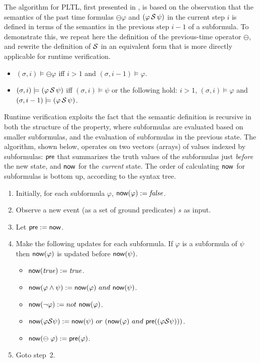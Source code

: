The algorithm for PLTL, first presented in \cite{HR}, 
is based on the observation that the semantics of the 
past time formulas $\ominus \varphi$ and $(\varphi\, {\cal S} \,\psi)$ in the current step $i$ is defined in terms of the semantics
in the previous step $i - 1$ of a subformula.
To demonstrate this, we repeat here the definition of the previous-time
operator $\ominus$, and rewrite the definition
of ${\cal S}$ in an equivalent form that is
more directly applicable for runtime verification.
\begin{itemize}
\item $( \sigma , i) \models \ominus \varphi$ iff $i > 1$ and $(\sigma, i-1) \models \varphi$.
\item $(\sigma , i) \models (\varphi \, {\cal S} \, \psi)$ iff $(\sigma , i) \models \psi$ or the following hold: $i>1$,
$( \sigma , i)  \models \varphi$ and 
$(\sigma , i-1 ) \models ( \varphi \, {\cal S} \, \psi )$.
\end{itemize}
Runtime verification exploits the fact that
the semantic definition is recursive in both the structure of the property, where subformulas
are evaluated based on smaller subformulas, and the
evaluation of subformulas in the previous state.
The algorithm, shown below, operates on two vectors (arrays) of values indexed by subformulas:  $\mathsf{pre}$ that summarizes the truth values of the
subformulas just {\em before} the new state, and $\mathsf{now}$ for the {\em current} state. The order of calculating $\mathsf{now}$ for subformulas is bottom up, according to the syntax tree.
\begin{enumerate}
\item Initially, for each subformula $\varphi$,
$\mathsf{now} ( \varphi ) := \mathit{false}$.
\item Observe a new event (as a set of ground predicates) $s$ as input. 
\item Let $\mathsf{pre} := \mathsf{now}$.
\item Make the following updates for each subformula. If $\varphi$ is
      a subformula of $\psi$ then $\mathsf{now} ( \varphi )$ is updated before 
      $\mathsf{now} ( \psi )$.

\begin{itemize}
  \item $\mathsf{now} ( \mathit{true} ) := \mathit{true}$.
  \item $\mathsf{now} (  \varphi \wedge \psi  ) := 
  \mathsf{now} ( \varphi )\  and\ \mathsf{now} ( \psi )$.
  \item $\current ( \neg \varphi  ) := not\ \current ( \varphi )$.
  \item $\current (  \varphi \since \psi  ) :=  
  \current ( \psi  )\ or\ ( \current ( \varphi ) \ and\ 
      \old ( ( \varphi \since  \psi )))$.
  \item $\mathsf{now} ( \ominus \; \varphi ) := \mathsf{pre} ( \varphi )$.
  
\end{itemize}
\item Goto step~2.
\end{enumerate}

